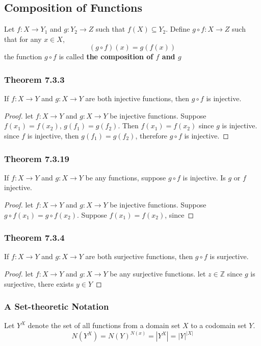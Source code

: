 \documentclass[12pt]{book}
\newcommand{\Z}{\mathbb{Z}}
\newcommand{\paren}[1]{\left( #1 \right)}
\newcommand{\abso}[1]{\left|#1 \right|}
\begin{document}
\subsection{Composition of Functions}
Let $f \colon X \to Y_1$ and $g \colon Y_2 \to Z$ such that $f(X) \subseteq Y_2$. Define $g \circ f \colon X \to Z$ such that for any $x \in X$, 
\[
\paren{g \circ f}(x) = g\paren{f(x)}
\]
the function $g \circ f$ is called \textbf{the composition of $f$ and $g$}

\subsubsection{Theorem 7.3.3}
If $f \colon X \to Y$ and $g \colon X \to Y$ are both injective functions, then $g \circ f$ is injective. 
\begin{proof}
    let $f \colon X \to Y$ and $g \colon X \to Y$ be injective functions. Suppose $ f(x_1) = f(x_2)$, $g(f_1) = g(f_2)$. Then $f(x_1)=f(x_2)$ since $g$ is injective. since $f$ is injective, then $g(f_1) = g(f_2)$, therefore $g \circ f$ is injective. 
\end{proof}

\subsubsection{Theorem 7.3.19}
If $f \colon X \to Y$ and $g \colon X \to Y$ be any functions, suppose $g \circ f$ is injective. Is $g$ or $f$ injective.
\begin{proof}
 let $f \colon X \to Y$ and $g \colon X \to Y$ be injective functions. Suppose $g \circ f(x_1) = g \circ f(x_2)$. Suppose $f(x_1) = f(x_2)$, since 
    
\end{proof}


\subsubsection{Theorem 7.3.4}
If $f \colon X \to Y$ and $g \colon X \to Y$ are both surjective functions, then $g \circ f$ is surjective.

\begin{proof}
    let $f \colon X \to Y$ and $g \colon X \to Y$ be any surjective functions. let $z \in \Z$ since $g$ is surjective, there exists $y \in Y$
\end{proof}


\subsubsection{A Set-theoretic Notation}
Let $Y^X$ denote the set of all functions from a domain set $X$ to a codomain set $Y$.
\[
N\paren{Y^X} = N\paren{Y}^{N\paren{x}} = \abso{Y^X} = \abso{Y}^{\abso{X}}
\]
\end{document}
